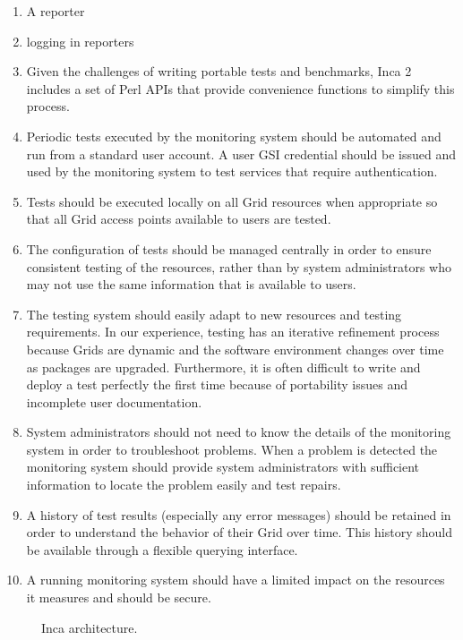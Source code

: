 \documentclass[times,10pt,twocolumn]{article}
\begin{document}
\begin{enumerate}
\item A reporter 
\item logging in reporters
\item Given the challenges of writing portable tests and benchmarks, Inca 2 
includes a set of Perl APIs that provide convenience functions to simplify
this process.

\item Periodic tests executed by the monitoring system should be automated and
run from a standard user account.  A user GSI credential should be issued and
used by the monitoring system to test services that require authentication.  
\item Tests should be executed locally on all Grid resources when appropriate so
that all Grid access points available to users are tested.  
\item The configuration of tests should be managed centrally in order to ensure
consistent testing of the resources, rather than by system administrators who
may not use the same information that is available to users.
\item The testing system should easily adapt to new resources and testing
requirements.  In our experience, testing has an iterative refinement process
because Grids are dynamic and the software environment changes over time as
packages are upgraded.  Furthermore, it is often difficult to write and deploy
a test perfectly the first time because of portability issues and incomplete
user documentation.   
\item System administrators should not need to know the details of the
monitoring system in order to troubleshoot problems.  When a problem is
detected the monitoring system should provide system administrators with
sufficient information to locate the problem easily and test repairs.
\item A history of test results (especially any error messages) should be
retained in order to understand the behavior of their Grid over time. This
history should be available through a flexible querying interface.
\item A running monitoring system should have a limited impact on the resources
it measures and should be secure.
\end{enumerate}


\begin{figure*}[htb]
  \centering
  \mbox{}
  \caption{\label{arch_fig} Inca architecture.}
\end{figure*}
\end{document}
